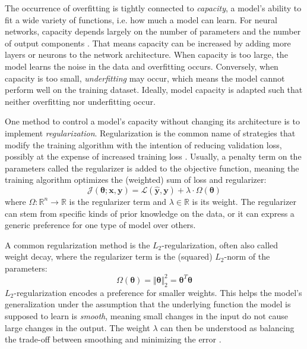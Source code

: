 The occurrence of overfitting is tightly connected to 
\textit{capacity}, a model's 
ability to ﬁt a wide variety of functions, i.e. how much a model
can learn. For neural networks, capacity depends largely on
the number of parameters and the number of output components
\parencite{capacity}. That means capacity can be increased by 
adding more layers or neurons to the network architecture. 
When capacity is too large, the model 
learns the noise in the data and overfitting occurs. 
Conversely, when capacity is too small, \textit{underfitting}
may occur, which means  the model cannot perform well 
on the training dataset. Ideally, model capacity is 
adapted such that neither overfitting nor underfitting occur. 


One method to control a model's capacity without changing 
its architecture is to implement \textit{regularization}. 
Regularization is the common name of strategies that 
modify the training algorithm with the intention of reducing
validation loss, possibly at the expense of increased training 
loss \Parencite[Chapter 5]{deeplearningbook}. 
Usually, a penalty term on the parameters 
called the regularizer is added to 
the objective function, meaning the training algorithm
optimizes the  (weighted) sum of loss and regularizer:
\begin{equation}
    \mathcal{J}(\bm{\theta}; \mathbf{x}, \mathbf{y}) = \mathcal{L}(\mathbf{\hat{y}}, \mathbf{y}) + \lambda \cdot \Omega(\bm{\theta})
\end{equation}
where $\Omega: \mathbb{R}^n \rightarrow \mathbb{R}$ is 
the regularizer term and $\lambda \in \mathbb{R}$ is its weight.
The regularizer 
can stem from specific kinds of prior knowledge on the data, 
or it can express a generic preference for one type of model 
over others.

A common regularization method is the $L_2$-regularization, 
often also called weight decay, 
where the regularizer term is the (squared)
$L_2$-norm of the parameters:
\begin{equation}
    \Omega(\bm{\theta}) = \Vert\bm{\theta}\Vert_{2}^{2} = \bm{\theta}^T\bm{\theta}
\end{equation}
$L_2$-regularization encodes a preference for smaller weights.
This helps the model's generalization under the assumption 
that the underlying function the model is supposed to learn is 
\textit{smooth}, meaning small changes in the input do not cause
large changes in the output. The weight $\lambda$ can then
be understood as balancing the trade-off between 
smoothing and minimizing the error \parencite{regularization}. 

